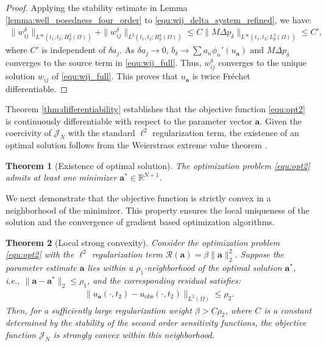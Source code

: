 \documentclass[11pt,reqno]{amsart}
\newtheorem{theorem}{Theorem}[section]
\begin{document}
\begin{proof}
	Applying the stability estimate in Lemma \ref{lemma:well_posedness_four_order} to \eqref{equ:wij_delta_system_refined}, we have:
	\begin{align*}
		\|w_{ij}^{\delta}\|_{L^{\infty}(t_1, t_2; H_p^2(\Omega))} + \|w_{ij}^{\delta}\|_{L^2(t_1,t_2; H^4_p(\Omega))} \leq C \|M\Delta p_{\delta}\|_{L^{\infty}(t_1, t_2; L_p^2(\Omega))} \leq C',
	\end{align*}
	where $C'$ is independent of $\delta a_j$. As $\delta a_j \to 0$, $b_{\delta} \to \sum a_n \phi_n'(u_{\mathbf{a}})$ and $M\Delta p_{\delta}$ converges to the source term in \eqref{equ:wij_full}. Thus, $w_{ij}^{\delta}$ converges to the unique solution $w_{ij}$ of \eqref{equ:wij_full}. This proves that $u_{\mathbf{a}}$ is twice Fréchet differentiable.
\end{proof}

Theorem \ref{thm:differentiability} establishes that the objective function \eqref{equ:opt2} is continuously differentiable with respect to the parameter vector $\mathbf{a}$. Given the coercivity of $\mathcal{J}_N$ with the standard $\ell^2$ regularization term, the existence of an optimal solution follows from the Weierstrass extreme value theorem \cite{gopfert1973mathematische}.

\begin{theorem}[Existence of optimal solution]
	The optimization problem \eqref{equ:opt2} admits at least one minimizer $\mathbf{a}^{*} \in \mathbb{R}^{N+1}$.
\end{theorem}

We next demonstrate that the objective function is strictly convex in a neighborhood of the minimizer. This property ensures the local uniqueness of the solution and the convergence of gradient based optimization algorithms.

\begin{theorem}[Local strong convexity]
	Consider the optimization problem \eqref{equ:opt2} with the $\ell^2$ regularization term $\mathcal{R}(\mathbf{a}) = \beta\|\mathbf{a}\|_2^2$. Suppose the parameter estimate $\mathbf{a}$ lies within a $\rho_1$-neighborhood of the optimal solution $\mathbf{a}^{*}$, i.e., $\|\mathbf{a} - \mathbf{a}^{*}\|_2 \leq \rho_1$, and the corresponding residual satisfies:
	\begin{align}
		\|u_{\mathbf{a}}(\cdot,t_2) - u_{\text{obs}}(\cdot,t_2)\|_{L^2(\Omega)} \leq \rho_2.
	\end{align}
	Then, for a sufficiently large regularization weight $\beta > C\rho_2$, where $C$ is a constant determined by the stability of the second order sensitivity functions, the objective function $\mathcal{J}_N$ is strongly convex within this neighborhood.
\end{theorem}
\end{document}
